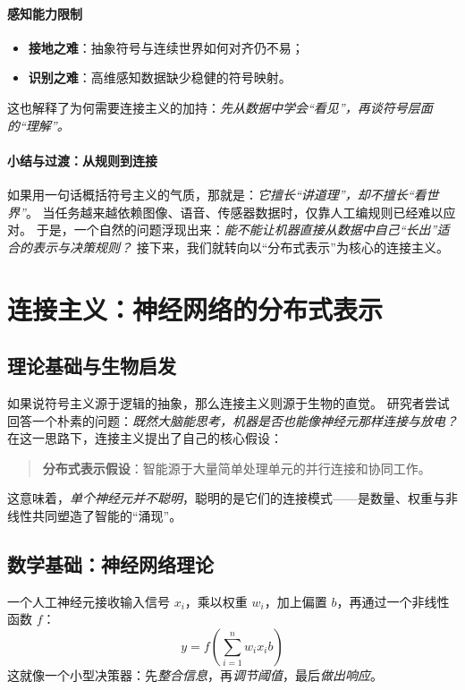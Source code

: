 \paragraph{感知能力限制}
\begin{itemize}
\item \textbf{接地之难}：抽象符号与连续世界如何对齐仍不易；
\item \textbf{识别之难}：高维感知数据缺少稳健的符号映射。
\end{itemize}
这也解释了为何需要连接主义的加持：\emph{先从数据中学会“看见”，再谈符号层面的“理解”。}

\paragraph{小结与过渡：从规则到连接}
如果用一句话概括符号主义的气质，那就是：\emph{它擅长“讲道理”，却不擅长“看世界”}。  
当任务越来越依赖图像、语音、传感器数据时，仅靠人工编规则已经难以应对。  
于是，一个自然的问题浮现出来：\emph{能不能让机器直接从数据中自己“长出”适合的表示与决策规则？}  
接下来，我们就转向以“分布式表示”为核心的连接主义。

\section{连接主义：神经网络的分布式表示}

\subsection{理论基础与生物启发}

如果说符号主义源于逻辑的抽象，那么连接主义则源于生物的直觉。  
研究者尝试回答一个朴素的问题：\emph{既然大脑能思考，机器是否也能像神经元那样连接与放电？}  
在这一思路下，连接主义提出了自己的核心假设：

\begin{quote}
\textbf{分布式表示假设}：智能源于大量简单处理单元的并行连接和协同工作。
\end{quote}
这意味着，\emph{单个神经元并不聪明}，聪明的是它们的连接模式——是数量、权重与非线性共同塑造了智能的“涌现”。

\subsection{数学基础：神经网络理论}

一个人工神经元接收输入信号 $x_i$，乘以权重 $w_i$，加上偏置 $b$，再通过一个非线性函数 $f$：  
$$y = f\left(\sum_{i=1}^{n} w_i x_i  b\right)$$
这就像一个小型决策器：先\emph{整合信息}，再\emph{调节阈值}，最后\emph{做出响应}。

